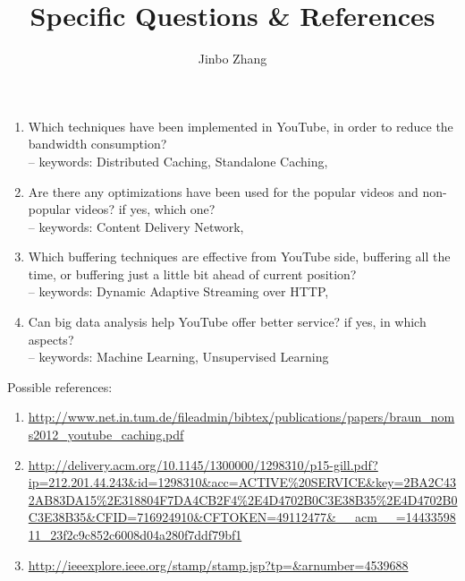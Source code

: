 \documentclass{article}
\title{Specific Questions \& References}
\author{Jinbo Zhang}
\begin{document}
\maketitle
\begin{enumerate}
\item Which techniques have been implemented in YouTube, in order to reduce the bandwidth consumption?\\
-- keywords: Distributed Caching, Standalone Caching,
\item Are there any optimizations have been used for the popular videos and non-popular videos? if yes, which one?\\
-- keywords: Content Delivery Network,
\item Which buffering techniques are effective from YouTube side, buffering all the time, or buffering just a little bit ahead of current position?\\
-- keywords: Dynamic Adaptive Streaming over HTTP,
\item Can big data analysis help YouTube offer better service? if yes, in which aspects?\\
-- keywords: Machine Learning, Unsupervised Learning
\end{enumerate}

Possible references:
\begin{enumerate}
\item\url{http://www.net.in.tum.de/fileadmin/bibtex/publications/papers/braun_noms2012_youtube_caching.pdf}
\item\url{http://delivery.acm.org/10.1145/1300000/1298310/p15-gill.pdf?ip=212.201.44.243&id=1298310&acc=ACTIVE%20SERVICE&key=2BA2C432AB83DA15%2E318804F7DA4CB2F4%2E4D4702B0C3E38B35%2E4D4702B0C3E38B35&CFID=716924910&CFTOKEN=49112477&__acm__=1443359811_23f2c9c852c6008d04a280f7ddf79bf1}
\item\url{http://ieeexplore.ieee.org/stamp/stamp.jsp?tp=&arnumber=4539688}
\end{enumerate}
\end{document}
